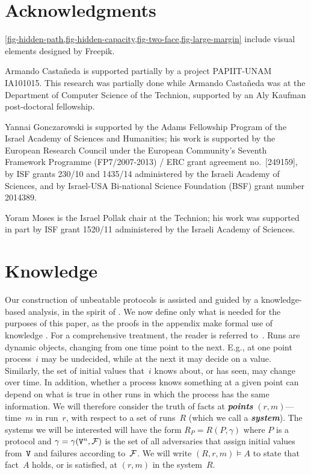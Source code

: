 \documentclass[11pt]{article}
\theoremstyle{definition}
\newcommand{\defemph}[1]{\textbf{\textit{#1}}}
\newcommand{\sat}{\models}
\newcommand{\Fmodel}{{\cal F}}
\newcommand{\Vals}{{\tt V}}
\begin{document}
\section{Acknowledgments}

\cref{fig-hidden-path,fig-hidden-capacity,fig-two-face,fig-large-margin} include visual elements designed by Freepik.

Armando Casta{\~n}eda is supported partially by a project PAPIIT-UNAM IA101015.
This research was partially done while Armando Casta{\~n}eda was at
the Department of Computer Science of the Technion,
supported by an Aly Kaufman post-doctoral fellowship.

Yannai Gonczarowski is supported by the Adams Fellowship Program of the Israel Academy of Sciences and Humanities; his work is supported by the European Research Council under the European Community's Seventh Framework Programme (FP7/2007-2013) / ERC grant agreement no.\ [249159], by ISF grants 230/10 and 1435/14 administered by the Israeli Academy of Sciences, and by Israel-USA Bi-national Science Foundation (BSF) grant number 2014389.

Yoram Moses is the Israel Pollak chair at the Technion; his work was supported in part by ISF grant 1520/11 administered by the Israeli Academy of Sciences.




\appendix
\section{Knowledge}
\label{sec:know}

Our construction of unbeatable protocols is assisted and guided by a knowledge-based analysis, in the spirit of \cite{FHMV,HM1}. We now define only what is needed for the purposes of this paper, as the proofs in the appendix make formal use of knowledge
. For a comprehensive treatment, the reader is referred to~\cite{FHMV}.
Runs are dynamic objects, changing from one time point to the next. E.g., at one point process~$i$ may be undecided, while at the next it may decide on a value. Similarly, the set of initial values that~$i$ knows about, or has seen, may change over time. In addition, whether a process knows something at a given point can depend on what is true in other runs in which the process has the same information.
We will therefore consider the truth of facts at \defemph{points} $(r,m)$---time~$m$ in run~$r$, with respect to a set of runs~$R$ (which we call a \defemph{system}).
The systems we will be interested will have the form $R_P=R(P,\gamma)$ where $P$ is a protocol and $\gamma=\gamma(\Vals^n,\Fmodel)$ is the set of all adversaries that assign initial values from~$\Vals$ and failures according to~$\Fmodel$. We will write $(R,r,m)\sat A$ to state that fact~$A$ holds, or is satisfied, at $(r,m)$ in the system~$R$.
\end{document}
